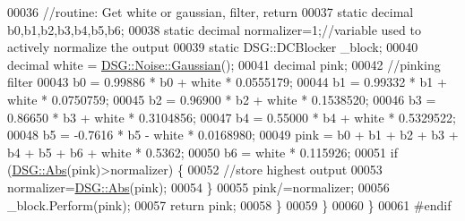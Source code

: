 \begin{DoxyCode}
00036             \textcolor{comment}{//routine: Get white or gaussian, filter, return}
00037             \textcolor{keyword}{static} decimal b0,b1,b2,b3,b4,b5,b6;
00038             \textcolor{keyword}{static} decimal normalizer=1;\textcolor{comment}{//variable used to actively normalize the output}
00039             \textcolor{keyword}{static} DSG::DCBlocker \_block;
00040             decimal white = \hyperlink{namespace_d_s_g_1_1_noise_a87c4bcd92a902d32df1d7f1d5acffcd4}{DSG::Noise::Gaussian}();
00041             decimal pink;
00042             \textcolor{comment}{//pinking filter}
00043             b0 = 0.99886 * b0 + white * 0.0555179;
00044             b1 = 0.99332 * b1 + white * 0.0750759;
00045             b2 = 0.96900 * b2 + white * 0.1538520;
00046             b3 = 0.86650 * b3 + white * 0.3104856;
00047             b4 = 0.55000 * b4 + white * 0.5329522;
00048             b5 = -0.7616 * b5 - white * 0.0168980;
00049             pink = b0 + b1 + b2 + b3 + b4 + b5 + b6 + white * 0.5362;
00050             b6 = white * 0.115926;
00051             \textcolor{keywordflow}{if} (\hyperlink{namespace_d_s_g_a0af03bade7e25e8da80e3022af0e45a7}{DSG::Abs}(pink)>normalizer) \{
00052                 \textcolor{comment}{//store highest output}
00053                 normalizer=\hyperlink{namespace_d_s_g_a0af03bade7e25e8da80e3022af0e45a7}{DSG::Abs}(pink);
00054             \}
00055             pink/=normalizer;
00056             \_block.Perform(pink);
00057             \textcolor{keywordflow}{return} pink;
00058         \}
00059     \}
00060 \}
00061 \textcolor{preprocessor}{#endif}
\end{DoxyCode}
